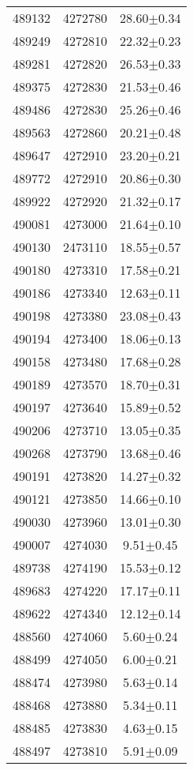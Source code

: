 \begin{center}
\begin{supertabular}{c c c}
489132	 & 	4272780	 & 	28.60$\pm$0.34\\ 
489249	 & 	4272810	 & 	22.32$\pm$0.23\\ 
489281	 & 	4272820	 & 	26.53$\pm$0.33\\ 
489375	 & 	4272830	 & 	21.53$\pm$0.46\\ 
489486	 & 	4272830	 & 	25.26$\pm$0.46\\ 
489563	 & 	4272860	 & 	20.21$\pm$0.48\\ 
489647	 & 	4272910	 & 	23.20$\pm$0.21\\ 
489772	 & 	4272910	 & 	20.86$\pm$0.30\\ 
489922	 & 	4272920	 & 	21.32$\pm$0.17\\ 
490081	 & 	4273000	 & 	21.64$\pm$0.10\\ 
490130	 & 	2473110	 & 	18.55$\pm$0.57\\ 
490180	 & 	4273310	 & 	17.58$\pm$0.21\\ 
490186	 & 	4273340	 & 	12.63$\pm$0.11\\ 
490198	 & 	4273380	 & 	23.08$\pm$0.43\\ 
490194	 & 	4273400	 & 	18.06$\pm$0.13\\ 
490158	 & 	4273480	 & 	17.68$\pm$0.28\\ 
490189	 & 	4273570	 & 	18.70$\pm$0.31\\ 
490197	 & 	4273640	 & 	15.89$\pm$0.52\\ 
490206	 & 	4273710	 & 	13.05$\pm$0.35\\ 
490268	 & 	4273790	 & 	13.68$\pm$0.46\\ 
490191	 & 	4273820	 & 	14.27$\pm$0.32\\ 
490121	 & 	4273850	 & 	14.66$\pm$0.10\\ 
490030	 & 	4273960	 & 	13.01$\pm$0.30\\ 
490007	 & 	4274030	 & 	9.51$\pm$0.45\\ 
489738	 & 	4274190	 & 	15.53$\pm$0.12\\ 
489683	 & 	4274220	 & 	17.17$\pm$0.11\\ 
489622	 & 	4274340	 & 	12.12$\pm$0.14\\ 
488560	 & 	4274060	 & 	5.60$\pm$0.24\\ 
488499	 & 	4274050	 & 	6.00$\pm$0.21\\ 
488474	 & 	4273980	 & 	5.63$\pm$0.14\\ 
488468	 & 	4273880	 & 	5.34$\pm$0.11\\ 
488485	 & 	4273830	 & 	4.63$\pm$0.15\\ 
488497	 & 	4273810	 & 	5.91$\pm$0.09\\ 

\end{supertabular}
\end{center}
